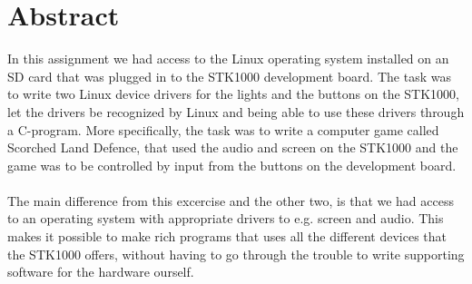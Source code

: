 \section*{Abstract}
In this assignment we had access to the Linux 
operating system installed on an SD card that was 
plugged in to the STK1000 development board. The task
was to write two Linux device drivers for the lights and 
the buttons on the STK1000, let the drivers be recognized 
by Linux and being able to use these drivers through a 
C-program. More specifically, the task was to write a 
computer game called Scorched Land Defence,
that used the audio and screen on the STK1000
and the game was to be controlled by input from the 
buttons on the development board.\\
\\
The main difference from this excercise and the 
other two, is that we had
access to an operating system with appropriate 
drivers to e.g. screen and audio. This makes it possible
to make rich programs that uses all the different devices
that the STK1000 offers, without having to go through
the trouble to write supporting software for the hardware ourself.